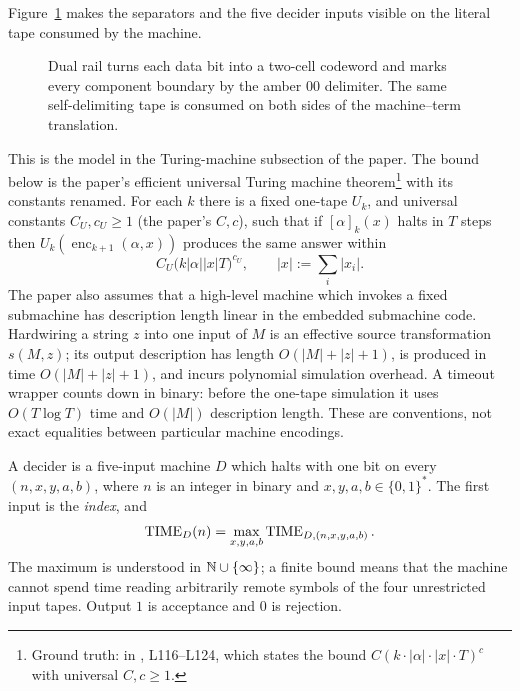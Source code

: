 Figure~\ref{fig:dual-rail} makes the separators and the five decider inputs
visible on the literal tape consumed by the machine.
\begin{figure}[t]
\centering

\caption{Dual rail turns each data bit into a two-cell codeword and marks every component boundary by the amber \(00\) delimiter.  The same self-delimiting tape is consumed on both sides of the machine--term translation.}
\label{fig:dual-rail}
\end{figure}

This is the model in the Turing-machine subsection of the paper.
  The bound below is the paper's
efficient universal Turing machine theorem\footnote{Ground truth:
 in , L116--L124,
which states the bound \(C(k\cdot|\alpha|\cdot|x|\cdot T)^c\) with universal
\(C,c\geq1\).} with its constants renamed.  For each \(k\) there is a fixed one-tape \(U_k\), and
universal constants \(C_U,c_U\geq1\) (the paper's \(C,c\)), such that if \([\alpha]_k(x)\) halts in
\(T\) steps then \(U_k(\operatorname{enc}_{k+1}(\alpha,x))\) produces the same
answer within
\[
 C_U\bigl(k|\alpha||x|T\bigr)^{c_U},
 \qquad |x|:=\sum_i|x_i|.
\]
The paper also assumes that a high-level machine which invokes a fixed
submachine has description length linear in the embedded submachine code.
Hardwiring a string \(z\) into one input of \(M\) is an effective source
transformation \(s(M,z)\); its output description has length
\(O(|M|+|z|+1)\), is produced in time \(O(|M|+|z|+1)\), and incurs polynomial
simulation overhead.  A timeout wrapper counts down in binary: before the
one-tape simulation it uses \(O(T\log T)\) time and \(O(|M|)\) description
length.  These are conventions, not exact equalities between particular
machine encodings.

\begin{definition}[Decider]
\label{def:paper-decider}
A decider is a five-input machine \(D\) which halts with one bit on every
\((n,x,y,a,b)\), where \(n\) is an integer in binary and
\(x,y,a,b\in\{0,1\}^*\).  The first input is the \emph{index}, and
\[
 \operatorname{TIME}_D(n)=\max_{x,y,a,b}\operatorname{TIME}_{D,(n,x,y,a,b)}.
\]
The maximum is understood in \(\mathbb N\cup\{\infty\}\); a finite bound means that
the machine cannot spend time reading arbitrarily remote symbols of the four
unrestricted input tapes.  Output \(1\) is acceptance and \(0\) is rejection.
\end{definition}

